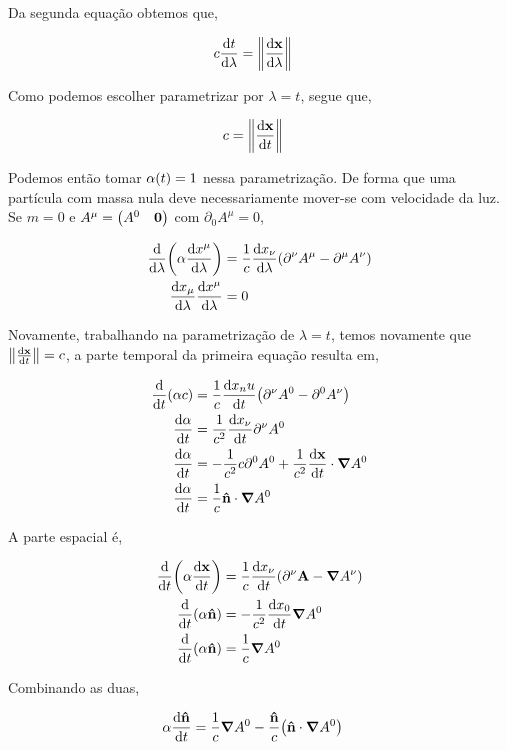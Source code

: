 \documentclass[twoside]{amsart}
\numberwithin{equation}{section}
\begin{document}
Da segunda equação obtemos que,

\begin{align}
    c\dv{t}{\lambda}&=\norm{\dv{\vb x}{\lambda}}
\end{align}

Como podemos escolher parametrizar por $\lambda=t$, segue que,

\begin{align}
    c&=\norm{\dv{\vb x}{t}}
\end{align}

Podemos então tomar $\alpha\qty(t) =1$ nessa parametrização. De forma que uma partícula com massa nula deve necessariamente mover-se com velocidade da luz. Se $m=0$ e $A^\mu=\mqty(A^0&\vb 0) $ com $\partial_0A^\mu=0$,

\begin{align}
    \dv{}{\lambda}\qty(\alpha\dv{x^\mu}{\lambda})&=\frac1c\dv{x_\nu}{\lambda}\qty(\partial^\nu A^\mu-\partial^\mu A^\nu)\\
    \dv{x_\mu}{\lambda}\dv{x^\mu}{\lambda}&=0
\end{align}

Novamente, trabalhando na parametrização de $\lambda = t$, temos novamente que $\norm{\dv{\vb x}{t}}=c$, a parte temporal da primeira equação resulta em,

\begin{align}
    \dv{}{t}\qty(\alpha c)&=\frac1c\dv{x_nu}{t}\qty(\partial^\nu A^0-\partial^0 A^\nu)\\
    \dv{\alpha}{t}&=\frac{1}{c^2}\dv{x_\nu}{t}\partial^\nu A^0\\
    \dv{\alpha}{t}&=-\frac{1}{c^2}c\partial^0 A^0+\frac{1}{c^2}\dv{\vb x}{t}\cdot \grad A^0\\
    \dv{\alpha}{t}&=\frac1c\vb {\hat n}\cdot\grad A^0
\end{align}

A parte espacial é,

\begin{align}
    \dv{}{t}\qty(\alpha\dv{\vb x}{t})&=\frac1c\dv{x_\nu}{t}\qty(\partial^\nu\vb A-\grad A^\nu)\\
    \dv{}{t}\qty(\alpha\vb {\hat n})&=-\frac{1}{c^2}\dv{x_0}{t}\grad A^0\\
    \dv{}{t}\qty(\alpha\vb {\hat n})&=\frac{1}{c}\grad A^0
\end{align}

Combinando as duas,

\begin{align}
    \alpha\dv{\vb{\hat n}}{t}&=\frac1c\grad A^0-\frac{\vb {\hat n}}{c}\qty(\vb{\hat n}\cdot\grad A^0)
\end{align}
\end{document}
